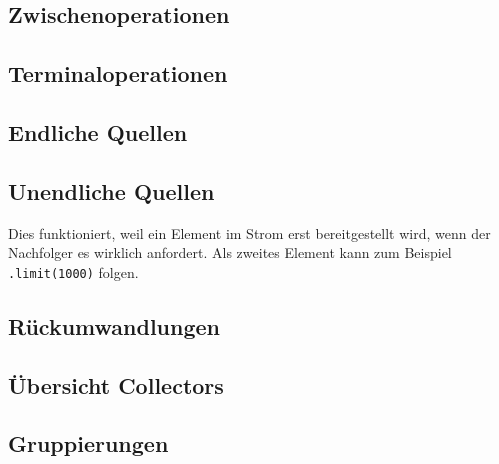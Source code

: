 	\subsection*{Zwischenoperationen}
		
	\subsection*{Terminaloperationen} 
		
	\begin{minipage}[t]{10cm}
		\subsection*{Endliche Quellen}
		
	\end{minipage}
	\hspace*{0.5cm}
	\begin{minipage}[t]{8.3cm}
		\subsection*{Unendliche Quellen}
		
		Dies funktioniert, weil ein Element im Strom erst bereitgestellt wird, wenn der Nachfolger es wirklich anfordert. Als zweites Element kann zum Beispiel \texttt{.limit(1000)} folgen.
	\end{minipage}
	\subsection*{Rückumwandlungen}
		\begin{minipage}[t]{8.9cm}
			
		\end{minipage}
		\hspace*{0.5cm}
		\begin{minipage}[t]{8.9cm}
			
		\end{minipage}
	\subsection*{Übersicht Collectors}
		
	\subsection*{Gruppierungen}
	
		
